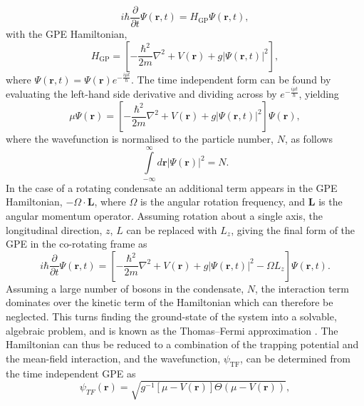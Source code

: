 \begin{equation}\label{eqn:gpe}
i\hbar\frac{\partial}{\partial t}\Psi(\textbf{r},t) = H_{\textrm{GP}} \Psi(\textbf{r},t),
\end{equation}
with the GPE Hamiltonian,
\begin{equation}\label{eqn:h_gp}
H_{\textrm{GP}} = \left[-\frac{\hbar^2}{2m}\nabla^2 + V(\textbf{r}) + g\vert\Psi(\textbf{r},t)\vert^2 \right],
\end{equation}
where $\Psi(\textbf{r},t) = \Psi(\textbf{r})e^{-\frac{i\mu t}{\hbar}}$.
 The time independent form can be found by evaluating the left-hand side derivative and dividing across by $e^{-\frac{i\mu t}{\hbar}}$, yielding
\begin{equation}
\mu\Psi(\textbf{r}) = \left[-\frac{\hbar^2}{2m}\nabla^2 + V(\textbf{r}) + g\vert\Psi(\textbf{r},t)\vert^2 \right]\Psi(\textbf{r}),
\end{equation}
where the wavefunction is normalised to the particle number, $N$, as follows
\begin{equation}\label{eqn:norm}
\displaystyle\int\limits_{-\infty}^{\infty}d\textbf{r} \left\vert \Psi\left(\textbf{r}\right) \right\vert^2 = N.
\end{equation}
In the case of a rotating condensate an additional term appears in the GPE Hamiltonian, $-\Omega\cdot \mathbf{L}$, where $\Omega$ is the angular rotation frequency, and $\mathbf{L}$ is the angular momentum operator. Assuming rotation about a single axis, the longitudinal direction, $z$, $L$ can be replaced with $L_z$, giving the final form of the GPE in the co-rotating frame as
\begin{equation}\label{eqn:gpe_rotation}
i\hbar\frac{\partial}{\partial t}\Psi(\textbf{r},t) = \left[-\frac{\hbar^2}{2m}\nabla^2 + V(\textbf{r}) + g\vert\Psi(\textbf{r},t)\vert^2 - \Omega L_z  \right]\Psi(\textbf{r},t).
\end{equation}
Assuming a large number of bosons in the condensate, $N$, the interaction term dominates over the kinetic term of the Hamiltonian which can therefore be neglected. This turns finding the ground-state of the system into a solvable, algebraic problem, and is known as the Thomas--Fermi approximation \cite[~p. 84]{BK:Ueda_2010}. The Hamiltonian can thus be reduced to a combination of the trapping potential and the mean-field interaction, and the wavefunction, $\psi_{\textrm{TF}}$, can be determined from the time independent GPE as
\begin{equation}
\psi_{TF}(\textbf{r}) = \sqrt{ g^{-1}[\mu - V(\textbf{r})] \Theta(\mu - V(\textbf{r}))},
\end{equation}
